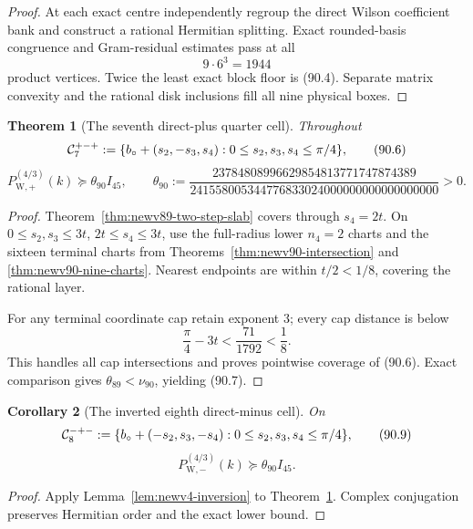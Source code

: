 \documentclass[11pt,oneside]{article}
\newtheorem{theorem}{Theorem}[section]
\newtheorem{corollary}[theorem]{Corollary}
\theoremstyle{definition}
\theoremstyle{remark}
\begin{document}
\begin{proof}
At each exact centre independently regroup the direct Wilson
coefficient bank and construct a rational Hermitian splitting.
Exact rounded-basis congruence and Gram-residual estimates pass at
all
\[
 9\cdot6^3=1944                                       \tag{90.5}
\]
product vertices.  Twice the least exact block floor is (90.4).
Separate matrix convexity and the rational disk inclusions fill all
nine physical boxes.
\end{proof}

\begin{theorem}[The seventh direct-plus quarter cell]
\label{thm:newv90-seventh-cell}
Throughout
\[
 {\cal C}^{+-+}_7:=
 \{b_\circ+(s_2,-s_3,s_4):
 0\leq s_2,s_3,s_4\leq\pi/4\},                       \tag{90.6}
\]
\[
 P_{\mathrm W,+}^{(4/3)}(k)
 \succeq\theta_{90}I_{45},\qquad
 \theta_{90}:=
 \frac{23784808996629854813771747874389}
 {241558005344776833024000000000000000000}>0.         \tag{90.7}
\]
\end{theorem}

\begin{proof}
Theorem~\ref{thm:newv89-two-step-slab} covers through \(s_4=2t\).
On \(0\leq s_2,s_3\leq3t\), \(2t\leq s_4\leq3t\), use the
full-radius lower \(n_4=2\) charts and the sixteen terminal charts
from Theorems~\ref{thm:newv90-intersection} and
\ref{thm:newv90-nine-charts}.  Nearest endpoints are within
\(t/2<1/8\), covering the rational layer.

For any terminal coordinate cap retain exponent \(3\); every cap
distance is below
\[
 \frac{\pi}{4}-3t<\frac{71}{1792}<\frac18.            \tag{90.8}
\]
This handles all cap intersections and proves pointwise coverage of
(90.6).  Exact comparison gives
\(\theta_{89}<\nu_{90}\), yielding (90.7).
\end{proof}

\begin{corollary}[The inverted eighth direct-minus cell]
\label{cor:newv90-inverted-eighth}
On
\[
 {\cal C}^{-+-}_8:=
 \{b_\circ+(-s_2,s_3,-s_4):
 0\leq s_2,s_3,s_4\leq\pi/4\},                       \tag{90.9}
\]
\[
 P_{\mathrm W,-}^{(4/3)}(k)
 \succeq\theta_{90}I_{45}.                            \tag{90.10}
\]
\end{corollary}

\begin{proof}
Apply Lemma~\ref{lem:newv4-inversion} to
Theorem~\ref{thm:newv90-seventh-cell}.  Complex conjugation preserves
Hermitian order and the exact lower bound.
\end{proof}
\end{document}
